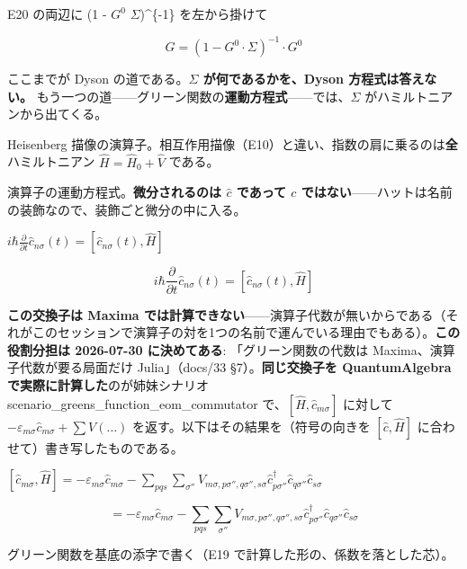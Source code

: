 \documentclass[dvipdfmx,a4paper,11pt]{jsarticle}
\begin{document}
E20 の両辺に (1 - $G^0$ $\Sigma$)\^{}\{-1\} を左から掛けて

\begin{equation}
  G=\left(1-G^{0}\cdot \Sigma\right)^{-1}\cdot G^{0}
  \label{eq:E21}
\end{equation}

ここまでが Dyson の道である。\textbf{$\Sigma$ が何であるかを、Dyson 方程式は答えない。} もう一つの道——グリーン関数の\textbf{運動方程式}——では、$\Sigma$ がハミルトニアンから出てくる。

Heisenberg 描像の演算子。相互作用描像（E10）と違い、指数の肩に乗るのは\textbf{全}ハミルトニアン $\hat H=\hat H_0+\hat V$ である。

演算子の運動方程式。\textbf{微分されるのは $\hat c$ であって $c$ ではない}——ハットは名前の装飾なので、装飾ごと微分の中に入る。

$i\hbar \frac{\partial}{\partial t} \hat c_{n\sigma}(t) = [\hat c_{n\sigma}(t), \hat H]$

\begin{equation}
  i\hbar \frac{\partial}{\partial t} \hat c_{n\sigma}(t) = [\hat c_{n\sigma}(t), \hat H]
  \label{eq:E22}
\end{equation}

\textbf{この交換子は Maxima では計算できない}——演算子代数が無いからである（それがこのセッションで演算子の対を1つの名前で運んでいる理由でもある）。\textbf{この役割分担は 2026-07-30 に決めてある}: 「グリーン関数の代数は Maxima、演算子代数が要る局面だけ Julia」（docs/33 §7）。\textbf{同じ交換子を QuantumAlgebra で実際に計算した}のが姉妹シナリオ scenario\_greens\_function\_eom\_commutator で、$[\hat H,\hat c_{m\sigma}]$ に対して $-\varepsilon_{m\sigma}\hat c_{m\sigma} + \sum V(\ldots)$ を返す。以下はその結果を（符号の向きを $[\hat c,\hat H]$ に合わせて）書き写したものである。

$[\hat c_{m\sigma}, \hat H] = -\varepsilon_{m\sigma}\hat c_{m\sigma} - \sum_{p q s}\sum_{\sigma''} V_{m\sigma,p\sigma'',q\sigma'',s\sigma} \hat c^\dagger_{p\sigma''} \hat c_{q\sigma''} \hat c_{s\sigma}$

\begin{equation}
  [\hat c_{m\sigma}, \hat H] = -\varepsilon_{m\sigma}\hat c_{m\sigma} - \sum_{p q s}\sum_{\sigma''} V_{m\sigma,p\sigma'',q\sigma'',s\sigma} \hat c^\dagger_{p\sigma''} \hat c_{q\sigma''} \hat c_{s\sigma}
  \label{eq:E23}
\end{equation}

グリーン関数を基底の添字で書く（E19 で計算した形の、係数を落とした芯）。
\end{document}
